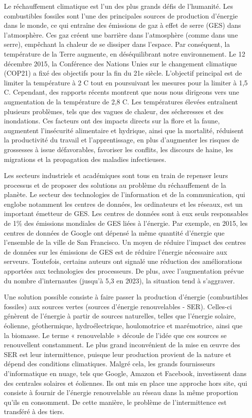 Le réchauffement climatique est l'un des plus grands défis de l'humanité. Les combustibles fossiles sont l'une des principales sources de production d'énergie dans le monde, ce qui entraîne des émissions de gaz à effet de serre (GES) dans l'atmosphère. Ces gaz créent une barrière dans l'atmosphère (comme dans une serre), empêchant la chaleur de se dissiper dans l'espace. Par conséquent, la température de la Terre augmente, en déséquilibrant notre environnement. Le 12 décembre 2015, la Conférence des Nations Unies sur le changement climatique (COP21) a fixé des objectifs pour la fin du 21e siècle. L'objectif principal est de limiter la température à 2 \degree C tout en poursuivant les mesures pour la limiter à 1,5 \degree C. Cependant, des rapports récents montrent que nous nous dirigeons vers une augmentation de la température de 2,8 \degree C. Les températures élevées entraînent plusieurs problèmes, tels que des vagues de chaleur, des sécheresses et des inondations. Ces facteurs ont des impacts directs sur la flore et la faune, augmentent l'insécurité alimentaire et hydrique, ainsi que la mortalité, réduisent la productivité du travail et l'apprentissage, en plus d'augmenter les risques de grossesses à issue défavorables, favoriser les conflits, les discours de haine, les migrations et la propagation des maladies infectieuses.

Les secteurs industriels et académiques sont tous en train de repenser leurs processus et de proposer des solutions au problème du réchauffement de la planète. Le secteur des technologies de l'information et de la communication, qui englobe notamment les centres de données, les ordinateurs et les réseaux, est un important émetteur de GES. Les centres de données sont à eux seuls responsables de 1\% des émissions mondiales de GES liées à l'énergie. Par exemple, en 2015, les centres de données de Google ont dépensé la même quantité d'énergie que l'ensemble de la ville de San Francisco. Un moyen de réduire l'impact des centres de données sur les émissions de GES est de réduire l'énergie nécessaire aux serveurs. Toutefois, certains auteurs ont signalé une réduction des améliorations apportées aux technologies des processeurs. De plus, avec l'augmentation prévue du nombre d'internautes (jusqu'à 5,3 en 2023), la situation tend à s'aggraver. 

Une solution possible consiste à faire passer la production d'énergie (combustibles fossiles) aux sources vertes (sources d'énergie renouvelables - SER). Celles-ci génèrent de l'énergie à partir de sources naturelles, telles que l'énergie solaire, éolienne, géothermique, hydroélectrique, houlomotrice et marémotrice, ainsi que la biomasse. Le terme « renouvelable » découle de l'idée que ces sources se renouvellent constamment. Le plus grand inconvénient de la mise en œuvre des SER est leur intermittence, puisque leur production provient de la nature et dépend des conditions climatiques. Malgré cela, les grands fournisseurs d'informatique en nuage, tels que Google, Amazon et Facebook, investissent dans des centrales solaires et éoliennes. Ils ont mis en place une approche hors site, qui consiste à fournir de l'énergie renouvelable au réseau dans la même proportion qu'ils en consomment. De cette manière, le problème de l'intermittence est transféré à des tiers. 

